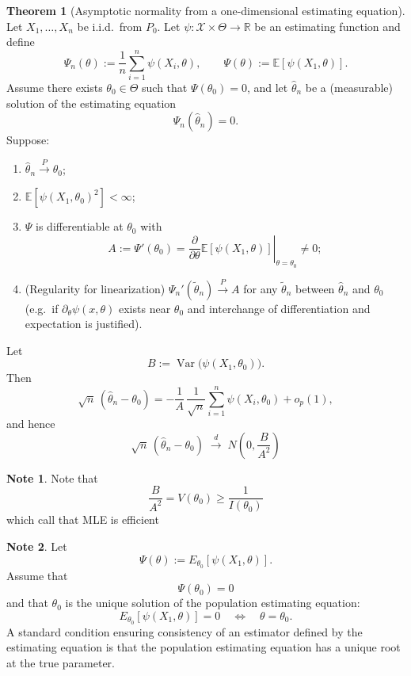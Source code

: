 \documentclass[11pt]{article}
\theoremstyle{definition}
\newtheorem{note}{Note}[section]
\newtheorem{theo}{Theorem}[section]
\begin{document}
\begin{theo}[Asymptotic normality from a one-dimensional estimating equation]
Let $X_1,\dots,X_n$ be i.i.d.\ from $P_0$. Let $\psi:\mathcal X\times\Theta\to\mathbb R$ be an estimating
function and define
\[
\Psi_n(\theta):=\frac{1}{n}\sum_{i=1}^n \psi(X_i,\theta),
\qquad
\Psi(\theta):=\mathbb E[\psi(X_1,\theta)].
\]
Assume there exists $\theta_0\in\Theta$ such that $\Psi(\theta_0)=0$, and let $\hat\theta_n$ be a (measurable)
solution of the estimating equation
\[
\Psi_n(\hat\theta_n)=0.
\]
Suppose:
\begin{enumerate}
\item $\hat\theta_n \xrightarrow{P} \theta_0$;
\item $\mathbb E[\psi(X_1,\theta_0)^2]<\infty$;
\item $\Psi$ is differentiable at $\theta_0$ with
\[
A:=\Psi'(\theta_0)=\left.\frac{\partial}{\partial\theta}\mathbb E[\psi(X_1,\theta)]\right|_{\theta=\theta_0}\neq 0;
\]
\item (Regularity for linearization) $\Psi_n'(\tilde\theta_n)\xrightarrow{P}A$ for any $\tilde\theta_n$
between $\hat\theta_n$ and $\theta_0$ (e.g.\ if $\partial_\theta\psi(x,\theta)$ exists near $\theta_0$ and
interchange of differentiation and expectation is justified).
\end{enumerate}
Let
\[
B:=\operatorname{Var}\!\big(\psi(X_1,\theta_0)\big).
\]
Then
\[
\sqrt{n}\,(\hat\theta_n-\theta_0)
=
-\frac{1}{A}\,\frac{1}{\sqrt{n}}\sum_{i=1}^n \psi(X_i,\theta_0) + o_p(1),
\]
and hence
\[
\sqrt{n}\,(\hat\theta_n-\theta_0)\;\xrightarrow{d}\;N\!\left(0,\frac{B}{A^2}\right)
\]
\end{theo}
\begin{note}
    Note that
    \[
    \frac{B}{A^2} = V(\theta_0)\geq \frac{1}{I(\theta_0)}
    \]
    which call that MLE is efficient
\end{note}
\begin{note}
    Let
\[
\Psi(\theta) := E_{\theta_0}\!\left[\psi(X_1,\theta)\right].
\]
Assume that
\[
\Psi(\theta_0) = 0
\]
and that $\theta_0$ is the unique solution of the population estimating equation:
\[
E_{\theta_0}\!\left[\psi(X_1,\theta)\right] = 0
\quad \Longleftrightarrow \quad
\theta = \theta_0 .
\]
A standard condition ensuring consistency of an estimator defined by the estimating equation is that the population estimating equation has a unique root at the true parameter.
\end{note}
\end{document}
